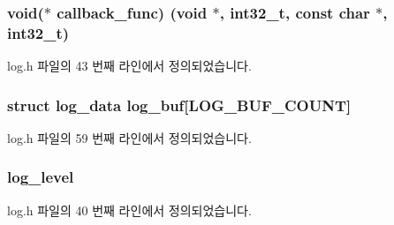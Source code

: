\subsubsection[{\texorpdfstring{callback\+\_\+func}{callback_func}}]{\setlength{\rightskip}{0pt plus 5cm}void($\ast$ callback\+\_\+func) (void $\ast$, {\bf int32\+\_\+t}, const char $\ast$, {\bf int32\+\_\+t})\hspace{0.3cm}{\ttfamily [protected]}}\hypertarget{classavdecc__lib_1_1log_a1e4db5370768bd861a59049d170732bd}{}\label{classavdecc__lib_1_1log_a1e4db5370768bd861a59049d170732bd}


log.\+h 파일의 43 번째 라인에서 정의되었습니다.

\subsubsection[{\texorpdfstring{log\+\_\+buf}{log_buf}}]{\setlength{\rightskip}{0pt plus 5cm}struct {\bf log\+\_\+data} log\+\_\+buf\mbox{[}{\bf L\+O\+G\+\_\+\+B\+U\+F\+\_\+\+C\+O\+U\+NT}\mbox{]}\hspace{0.3cm}{\ttfamily [protected]}}\hypertarget{classavdecc__lib_1_1log_a2a5ef536ff60c1a9a38f36c0df2f38da}{}\label{classavdecc__lib_1_1log_a2a5ef536ff60c1a9a38f36c0df2f38da}


log.\+h 파일의 59 번째 라인에서 정의되었습니다.

\subsubsection[{\texorpdfstring{log\+\_\+level}{log_level}}]{ log\+\_\+level\hspace{0.3cm}{\ttfamily [protected]}}\hypertarget{classavdecc__lib_1_1log_aa07e39131a3e0ab9ffd691b0f455134d}{}\label{classavdecc__lib_1_1log_aa07e39131a3e0ab9ffd691b0f455134d}


log.\+h 파일의 40 번째 라인에서 정의되었습니다.

